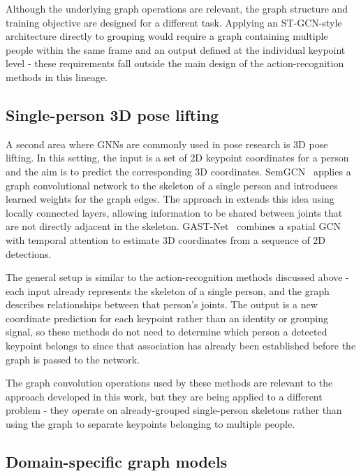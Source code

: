 Although the underlying graph operations are relevant,
the graph structure and training objective are designed for a different task.
Applying an ST-GCN-style architecture directly to grouping
would require a graph containing multiple people within the same frame
and an output defined at the individual keypoint level -
these requirements fall outside the main design of the action-recognition methods in this lineage.

\subsection{Single-person 3D pose lifting}
\label{sec_lit_gnn_pose_3d}

A second area where GNNs are commonly used in pose research is 3D pose lifting.
In this setting, the input is a set of 2D keypoint coordinates for a person
and the aim is to predict the corresponding 3D coordinates.
SemGCN~\cite{zhao2019semanticgcn} applies a graph convolutional network to the skeleton of a single person
and introduces learned weights for the graph edges.
The approach in \cite{ci2019optimizing} extends this idea using locally connected layers,
allowing information to be shared between joints that are not directly adjacent in the skeleton.
GAST-Net~\cite{liu2020gastnet} combines a spatial GCN with temporal attention
to estimate 3D coordinates from a sequence of 2D detections.

The general setup is similar to the action-recognition methods discussed above -
each input already represents the skeleton of a single person,
and the graph describes relationships between that person's joints.
The output is a new coordinate prediction for each keypoint rather than an identity or grouping signal,
so these methods do not need to determine which person a detected keypoint belongs to
since that association has already been established before the graph is passed to the network.

The graph convolution operations used by these methods are relevant to the approach developed in this work,
but they are being applied to a different problem -
they operate on already-grouped single-person skeletons
rather than using the graph to separate keypoints belonging to multiple people.

\subsection{Domain-specific graph models}
\label{sec_lit_gnn_pose_domain}

